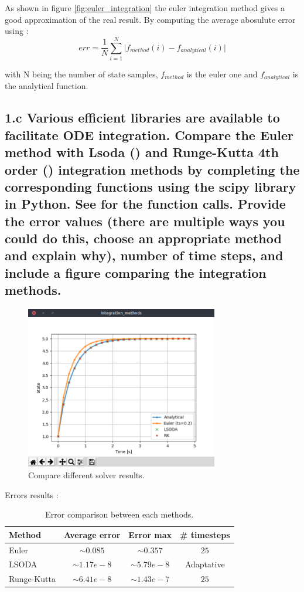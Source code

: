 \documentclass{cmc}
\begin{document}
As shown in figure \ref{fig:euler_integration} the euler integration method gives a good approximation of the real result. By computing the average abosulute error using :
$$err = \frac{1}{N} \sum_{i=1}^N \lvert f_{method}(i) - f_{analytical}(i) \rvert$$

with N being the number of state samples, $f_{method}$ is the euler one and $f_{analytical}$ is the analytical function.

\subsection*{1.c Various efficient libraries are available to facilitate ODE
  integration. Compare the Euler method with Lsoda
  () %
  and Runge-Kutta 4th order
  () %
  integration methods by completing the corresponding functions using the scipy
  library in Python. See  %
  for the function calls. Provide the error values (there are multiple ways you
  could do this, choose an appropriate method and explain why), number of time
  steps, and include a figure comparing the integration methods. }

\begin{figure}[H]
  \centering
  \includegraphics[width=0.75\textwidth,trim={0 1.25cm 0 0},clip]{figures/ex1_tests_solver.png}
  \caption{Compare different solver results.}
  \label{fig:ex1_tests_solver}
\end{figure}

Errors results :

\begin{table}[H]
\centering
\caption{Error comparison between each methods.}
	\begin{tabular}{lccc}
		\hline
		\textbf{Method} & \textbf{Average error} & \textbf{Error max} & \textbf{\# timesteps} \\ \hline \hline
		Euler & $\sim 0.085$ & $\sim 0.357$ & $25$ \\
		LSODA & $\sim 1.17 e-8$ & $\sim 5.79 e-8$ & Adaptative \\
		Runge-Kutta & $\sim 6.41 e-8$ & $\sim 1.43e-7$ & $25$ \\ \hline
	\end{tabular}
\end{table}
\end{document}
